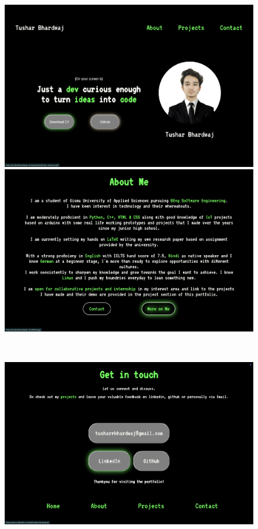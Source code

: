\documentclass{report}
\begin{document}
\begin{figure}[h]
    \centering
    \begin{minipage}{0.49\textwidth}
        \centering
        \includegraphics[width=1\linewidth]{webshots/front.png}
    \end{minipage}
    \begin{minipage}{0.49\textwidth}
        \centering
        \includegraphics[width=1\linewidth]{webshots/about.png}  
    \end{minipage}
    \\
    \begin{minipage}{0.49\textwidth}
        \centering
        \includegraphics[width=1\linewidth]{webshots/contact.png}

\end{minipage}
\end{figure}
\end{document}
